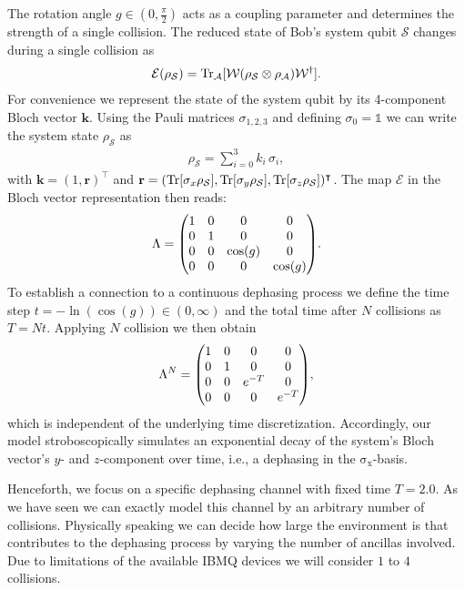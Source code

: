 \documentclass[aps,pra,twocolumn,superscriptaddress,showemail,showpacs,longbibliography]{revtex4-2}
\newcommand{\id}{\mathds{1}} %
\newcommand{\Sys}{\mathcal{S}} %
\newcommand{\Anc}{\mathcal{A}} %
\newcommand{\W}{\mathcal{W}}
\newcommand{\sigmax}{\operatorname{\sigma_x}}
\renewcommand{\vec}{\mathbf}
\begin{document}
The rotation angle $g \in (0,\frac{\pi}{2})$ acts as a coupling parameter and determines the strength of a single collision.
The reduced state of Bob's system qubit $\Sys$ changes during a single collision as
\begin{align}
\label{eq:single-step-map}
    \mathcal{E}(\rho_\Sys) = \Tr_\Anc[\W (\rho_\Sys\otimes\rho_\Anc) \W^\dagger].
\end{align}
For convenience we represent the state of the system qubit by its 4-component Bloch vector $\vec k$.
Using the Pauli matrices $\sigma_{1,2,3}$ and defining $\sigma_0 = \id$ we can write the system state $\rho_\Sys$ as
\begin{align}
    \rho_\Sys = \sum_{i=0}^3 k_i\, \sigma_i,
\end{align}
with $\vec{k} = (1,\vec{r})^\intercal$ and $\vec r = (\Tr[\sigma_x \rho_\Sys], \Tr[\sigma_y \rho_\Sys], \Tr[\sigma_z \rho_\Sys])^\intercal$.
The map $\mathcal{E}$ in the Bloch vector representation then reads:
\begin{equation}
    \Lambda = \mqty(1&0&0&0\\0&1&0&0\\0&0&\cos(g)&0\\0&0&0&\cos(g)).
\end{equation}
To establish a connection to a continuous dephasing process we define the time step $t = - \ln(\cos(g)) \in (0, \infty)$ and the total time after $N$ collisions as $T = N t$. Applying $N$ collision we then obtain
\begin{equation}
    \label{eq:LambdaN}
    \Lambda^N = \mqty(1&0&0&0\\0&1&0&0\\0&0&e^{-T}&0\\0&0&0&e^{-T}),
\end{equation}
which is independent of the underlying time discretization. Accordingly, our model stroboscopically simulates an exponential decay of the system's Bloch vector's $y$- and $z$-component over time, i.e., a dephasing in the $\sigmax$-basis.

Henceforth, we focus on a specific dephasing channel with fixed time $T=2.0$. As we have seen we can exactly model this channel by an arbitrary number of collisions. Physically speaking we can decide how large the environment is that contributes to the dephasing process by varying the number of ancillas involved. Due to limitations of the available IBMQ devices we will consider $1$ to $4$ collisions.
\end{document}
